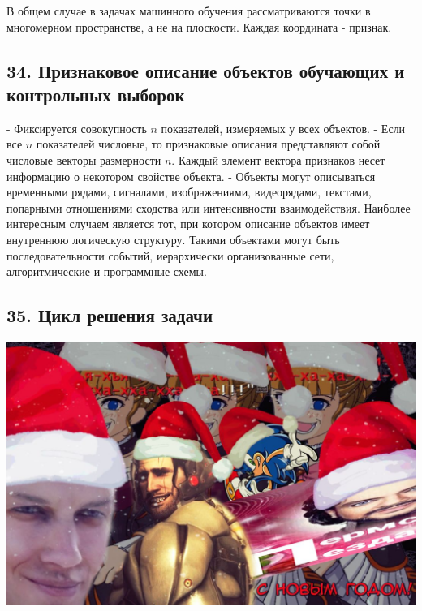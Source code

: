 В общем случае в задачах машинного обучения рассматриваются точки в
многомерном пространстве, а не на плоскости.
Каждая координата - признак.

\subsection{34. Признаковое описание объектов обучающих и контрольных выборок}

- Фиксируется совокупность $n$ показателей, измеряемых у всех объектов.
- Если все $n$ показателей числовые, то признаковые описания представляют
собой числовые векторы размерности $n$.
Каждый элемент вектора признаков несет информацию о некотором свойстве
объекта.
- Объекты могут описываться временными рядами, сигналами, изображениями,
видеорядами, текстами, попарными отношениями сходства или интенсивности
взаимодействия.
Наиболее интересным случаем является тот, при котором описание объектов
имеет внутреннюю логическую структуру.
Такими объектами могут быть последовательности событий, иерархически
организованные сети, алгоритмические и программные схемы.

\subsection{35. Цикл решения задачи}

\includegraphics[scale=0.3]{figures/samplefigure.jpg}